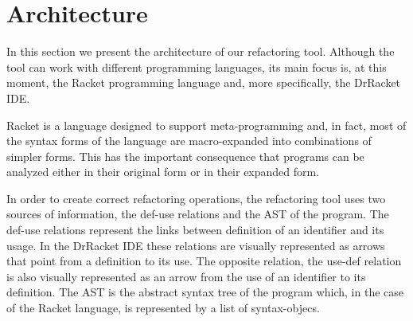 \section{Architecture}


In this section we present the architecture of our refactoring tool.
Although the tool can work with different programming languages, its
main focus is, at this moment, the Racket programming language and,
more specifically, the DrRacket IDE.

Racket is a language designed to support meta-programming and, in
fact, most of the syntax forms of the language are macro-expanded into
combinations of simpler forms.  This has the important consequence
that programs can be analyzed either in their original form or in
their expanded form.

In order to create correct refactoring operations, the refactoring
tool uses two sources of information, the def-use relations and the
AST of the program.  The def-use relations represent the links between
definition of an identifier and its usage.  In the DrRacket IDE these
relations are visually represented as arrows that point from a
definition to its use.  The opposite relation, the use-def relation is
also visually represented as an arrow from the use of an identifier to
its definition.  The AST is the abstract syntax tree of the program
which, in the case of the Racket language, is represented by a list of
syntax-objecs.  %



